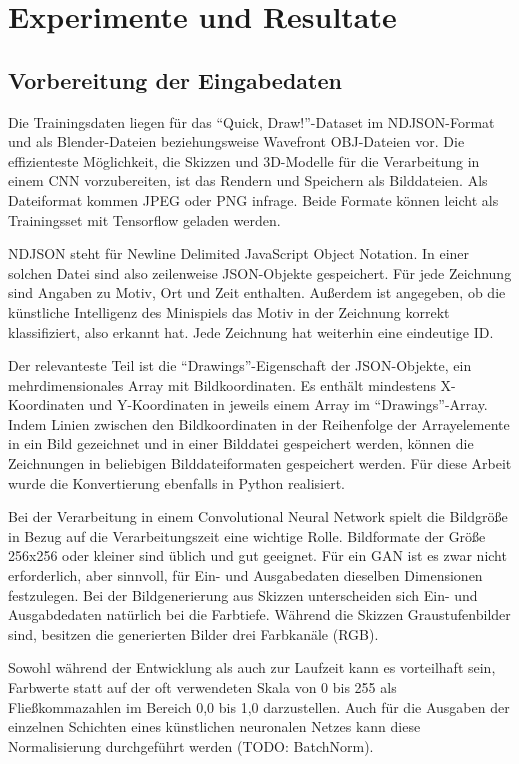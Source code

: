 \chapter{Experimente und Resultate}
\label{ch:conduct}

\section{Vorbereitung der Eingabedaten}
\label{sec:preparation}
Die Trainingsdaten liegen für das ``Quick, Draw!''-Dataset im NDJSON-Format und als Blender-Dateien beziehungsweise
Wavefront OBJ-Dateien vor. Die effizienteste Möglichkeit, die Skizzen und 3D-Modelle für die Verarbeitung in einem CNN vorzubereiten, ist das Rendern und  Speichern als Bilddateien. Als Dateiformat kommen JPEG oder PNG infrage. Beide Formate können leicht als Trainingsset mit Tensorflow geladen werden.

NDJSON steht für Newline Delimited JavaScript Object Notation. In einer solchen Datei sind also zeilenweise JSON-Objekte gespeichert. Für jede Zeichnung sind Angaben zu Motiv, Ort und Zeit enthalten. Außerdem ist angegeben, ob die künstliche Intelligenz des Minispiels das Motiv in der Zeichnung korrekt klassifiziert, also erkannt hat. Jede Zeichnung hat weiterhin eine eindeutige ID.

Der relevanteste Teil ist die ``Drawings''-Eigenschaft der JSON-Objekte, ein mehrdimensionales Array mit Bildkoordinaten. Es enthält mindestens X-Koordinaten und Y-Koordinaten in jeweils einem Array im ``Drawings''-Array. Indem Linien zwischen den Bildkoordinaten in der Reihenfolge der Arrayelemente in ein Bild gezeichnet und in einer Bilddatei gespeichert werden, können die Zeichnungen in beliebigen Bilddateiformaten gespeichert werden. Für diese Arbeit wurde die Konvertierung ebenfalls in Python realisiert.



Bei der Verarbeitung in einem Convolutional Neural Network spielt die Bildgröße
in Bezug auf die Verarbeitungszeit eine wichtige Rolle. Bildformate der Größe 256x256 oder kleiner sind üblich und gut geeignet. Für ein GAN ist es zwar nicht erforderlich, aber sinnvoll, für Ein- und Ausgabedaten dieselben Dimensionen festzulegen. Bei der Bildgenerierung aus Skizzen unterscheiden sich Ein- und Ausgabdedaten natürlich bei die Farbtiefe. Während die Skizzen Graustufenbilder sind, besitzen die generierten Bilder drei Farbkanäle (RGB).

Sowohl während der Entwicklung als auch zur Laufzeit kann es vorteilhaft sein, Farbwerte statt auf der oft verwendeten Skala von 0 bis 255 als Fließkommazahlen im Bereich 0,0 bis 1,0 darzustellen. Auch für die Ausgaben der einzelnen Schichten eines künstlichen neuronalen Netzes kann diese Normalisierung durchgeführt werden (TODO: BatchNorm).


